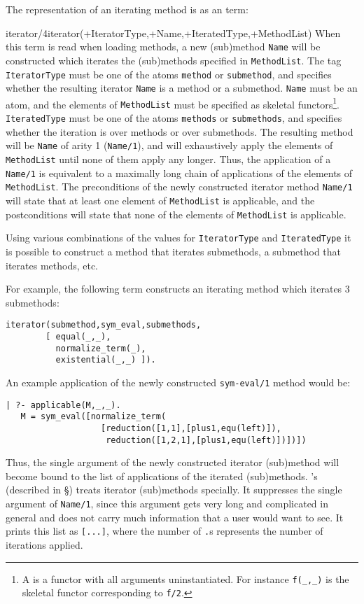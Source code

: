 The representation of an iterating method is as an  term:

\begin{predicate}{iterator/4}{iterator(+IteratorType,+Name,+IteratedType,+MethodList)}%
When this term is read when loading methods, a new (sub)method
{\tt Name} will be constructed which iterates the (sub)methods
specified in {\tt MethodList}. The tag {\tt IteratorType} must be one of the
atoms {\tt method} or {\tt submethod}, and specifies whether the
resulting iterator {\tt Name} is a method or a submethod.
{\tt Name} must be an atom, and the elements of {\tt MethodList}
must be specified as skeletal functors\footnote
{
A {\em {}\/} is a functor with all arguments
uninstantiated. For instance {\tt f(\_,\_)} is the skeletal functor
corresponding to {\tt f/2}. 
}.
{\tt IteratedType} must be one of the atoms {\tt methods} or
{\tt submethods}, and specifies whether the iteration is over methods or
over submethods. The resulting method will be {\tt Name} of arity 1
({\tt Name/1}), and will exhaustively apply the elements of
{\tt MethodList} until none of them apply any longer. Thus, the
application of a {\tt Name/1} is equivalent to a maximally long chain of
applications of the elements of {\tt MethodList}. The preconditions of
the newly constructed iterator method {\tt Name/1} will state that at least
one element of {\tt MethodList} is applicable, and the postconditions
will state that none of the elements of {\tt MethodList} is applicable.

Using various combinations of the values for {\tt IteratorType} and 
{\tt IteratedType} it is possible to construct a method that iterates
submethods, a submethod that iterates methods, etc. 

For example, the following  term constructs an iterating
method  which iterates 3 submethods:
{\small\begin{verbatim}
iterator(submethod,sym_eval,submethods,
        [ equal(_,_),
          normalize_term(_),
          existential(_,_) ]).
\end{verbatim}
}
An example application of the newly constructed {\tt sym-eval/1}
method would be:
{\small\begin{verbatim}
| ?- applicable(M,_,_).
   M = sym_eval([normalize_term(
                   [reduction([1,1],[plus1,equ(left)]),
                    reduction([1,2,1],[plus1,equ(left)])])])
\end{verbatim}
}
Thus, the single argument of the newly constructed iterator (sub)method
will become bound to the list of applications of the iterated
(sub)methods. {\clam}'s  (described in \S{}) treats iterator (sub)methods specially.
It suppresses the single argument of {\tt Name/1}, since this argument
gets very long and complicated in general and does not carry much
information that a user would want to see. It prints this list as
{\tt [...]}, where the number of {\tt .}s represents the number
of iterations applied. 


\end{predicate}
